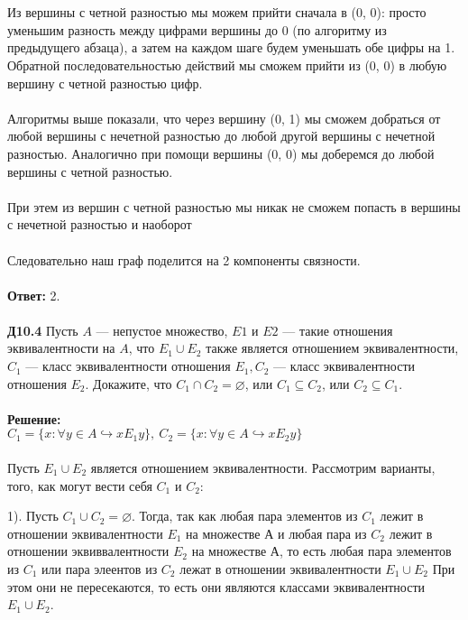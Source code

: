\documentclass[a4paper, 12pt]{article}
\begin{document}
    \\
    \\ Из вершины с четной разностью мы можем прийти сначала в (0, 0): просто уменьшим разность между цифрами вершины до 0 (по алгоритму из предыдущего абзаца), а затем на каждом шаге будем уменьшать обе цифры на 1. Обратной последовательностью действий мы сможем прийти из (0, 0) в любую вершину с четной разностью цифр.
    \\
    \\ Алгоритмы выше показали, что через вершину (0, 1) мы сможем добраться от любой вершины с нечетной разностью до любой другой вершины с нечетной разностью. Аналогично при помощи вершины (0, 0) мы доберемся до любой вершины с четной разностью.
    \\
    \\ При этем из вершин с четной разностью мы никак не сможем попасть в вершины с нечетной разностью и наоборот
    \\
    \\ Следовательно наш граф поделится на 2 компоненты связности.
    \\
    \\ \textbf{Ответ: } 2.
    \\
    \\ \textbf{Д10.4} Пусть $A$ — непустое множество, $E1$ и $E2$ — такие отношения эквивалентности на $A$, что $E_1 \cup E_2$ также является отношением эквивалентности, 
    $C_1$ — класс эквивалентности отношения $E_1, C_2$ — класс эквивалентности отношения $E_2$. Докажите, что $C_1 \cap C_2 = \varnothing$, или $C_1 \subseteq C_2$, или $C_2 \subseteq C_1$.
    \\
    \\ \textbf{Решение: }
    \\ $C_1 = \{x: \forall y \in A \hookrightarrow xE_1y\}, \ C_2 = \{x: \forall y \in A \hookrightarrow xE_2y\}$
    \\
    \\ Пусть $E_1 \cup E_2$ является отношением эквивалентности. Рассмотрим варианты, того, как могут вести себя $C_1$ и  $C_2$:
    \\
    \par 1). Пусть $C_1 \cup C_2 = \varnothing$. Тогда, так как любая пара элементов из $C_1$ лежит в отношении эквивалентности $E_1$ на множестве А и любая пара из $C_2$ лежит в отношении эквиввалентности $E_2$ на множестве А, то есть любая пара элементов из $C_1$ или пара элеентов из $C_2$ лежат в отношении эквивалентности $E_1 \cup E_2$ При этом они не пересекаются, то есть они являются классами эквивалентности $E_1 \cup E_2$.
\end{document}
